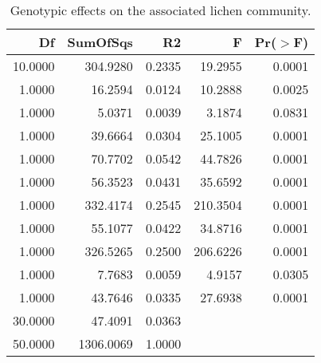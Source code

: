 \begin{table}[ht]
\centering
\begin{tabular}{rrrrr}
  \hline
Df & SumOfSqs & R2 & F & Pr($>$F) \\ 
  \hline
10.0000 & 304.9280 & 0.2335 & 19.2955 & 0.0001 \\ 
  1.0000 & 16.2594 & 0.0124 & 10.2888 & 0.0025 \\ 
  1.0000 & 5.0371 & 0.0039 & 3.1874 & 0.0831 \\ 
  1.0000 & 39.6664 & 0.0304 & 25.1005 & 0.0001 \\ 
  1.0000 & 70.7702 & 0.0542 & 44.7826 & 0.0001 \\ 
  1.0000 & 56.3523 & 0.0431 & 35.6592 & 0.0001 \\ 
  1.0000 & 332.4174 & 0.2545 & 210.3504 & 0.0001 \\ 
  1.0000 & 55.1077 & 0.0422 & 34.8716 & 0.0001 \\ 
  1.0000 & 326.5265 & 0.2500 & 206.6226 & 0.0001 \\ 
  1.0000 & 7.7683 & 0.0059 & 4.9157 & 0.0305 \\ 
  1.0000 & 43.7646 & 0.0335 & 27.6938 & 0.0001 \\ 
  30.0000 & 47.4091 & 0.0363 &  &  \\ 
  50.0000 & 1306.0069 & 1.0000 &  &  \\ 
   \hline
\end{tabular}
\caption{Genotypic effects on the associated lichen community.} 
\label{tab:h2_table}
\end{table}
